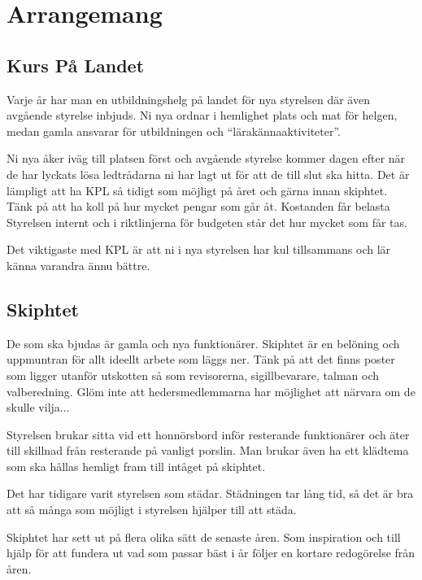 \documentclass[10pt]{article}
\begin{document}
    \section{Arrangemang}
    
    \subsection{Kurs På Landet}
    
    Varje år har man en utbildningshelg på landet för nya styrelsen där även avgående styrelse inbjuds. Ni nya ordnar i hemlighet plats och mat för helgen, medan gamla ansvarar för utbildningen och ``lärakännaaktiviteter''.
    
    Ni nya åker iväg till platsen först och avgående styrelse kommer dagen efter när de har lyckats lösa ledtrådarna ni har lagt ut för att de till slut ska hitta. Det är lämpligt att ha KPL så tidigt som möjligt på året och gärna innan skiphtet. Tänk på att ha koll på hur mycket pengar som går åt. Kostanden får belasta Styrelsen internt och i riktlinjerna för budgeten står det hur mycket som får tas.
    
    Det viktigaste med KPL är att ni i nya styrelsen har kul tillsammans och lär känna varandra ännu bättre.
    
    \subsection{Skiphtet}

    De som ska bjudas är gamla och nya funktionärer. Skiphtet är en belöning och uppmuntran för allt ideellt arbete som läggs ner. Tänk på att det finns poster som ligger utanför utskotten så som revisorerna, sigillbevarare, talman och valberedning. Glöm inte att hedersmedlemmarna har möjlighet att närvara om de skulle vilja...
    
    Styrelsen brukar sitta vid ett honnörsbord inför resterande funktionärer och äter till skillnad från resterande på vanligt porslin. Man brukar även ha ett klädtema som ska hållas hemligt fram till intåget på skiphtet.
    
    Det har tidigare varit styrelsen som städar. Städningen tar lång tid, så det är bra att så många som möjligt i styrelsen hjälper till att städa.
    
    Skiphtet har sett ut på flera olika sätt de senaste åren. Som inspiration och till hjälp för att fundera ut vad som passar bäst i år följer en kortare redogörelse från åren.
    
\end{document}
